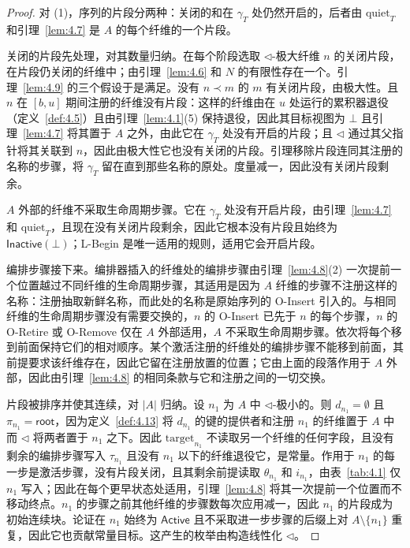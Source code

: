 \begin{proof}
对 (1)，序列的片段分两种：关闭的和在 $\gamma_T$ 处仍然开启的，后者由 $\mathrm{quiet}_T$ 和引理~\ref{lem:4.7} 是 $A$ 的每个纤维的一个片段。

关闭的片段先处理，对其数量归纳。在每个阶段选取 $\triangleleft$-极大纤维 $n$ 的关闭片段，在片段仍关闭的纤维中；由引理~\ref{lem:4.6} 和 $N$ 的有限性存在一个。引理~\ref{lem:4.9} 的三个假设于是满足。没有 $n \prec m$ 的 $m$ 有关闭片段，由极大性。且 $n$ 在 $[b, u]$ 期间注册的纤维没有片段：这样的纤维由在 $u$ 处运行的累积器退役（定义~\ref{def:4.5}）且由引理~\ref{lem:4.1}(5) 保持退役，因此其目标视图为 $\bot$ 且引理~\ref{lem:4.7} 将其置于 $A$ 之外，由此它在 $\gamma_T$ 处没有开启的片段；且 $\triangleleft$ 通过其父指针将其关联到 $n$，因此由极大性它也没有关闭的片段。引理移除片段连同其注册的名称的步骤，将 $\gamma_T$ 留在直到那些名称的原处。度量减一，因此没有关闭片段剩余。

$A$ 外部的纤维不采取生命周期步骤。它在 $\gamma_T$ 处没有开启片段，由引理~\ref{lem:4.7} 和 $\mathrm{quiet}_T$，且现在没有关闭片段剩余，因此它根本没有片段且始终为 $\mathsf{Inactive}(\bot)$；L-Begin 是唯一适用的规则，适用它会开启片段。

编排步骤接下来。编排器插入的纤维处的编排步骤由引理~\ref{lem:4.8}(2) 一次提前一个位置越过不同纤维的生命周期步骤，其适用是因为 $A$ 纤维的步骤不注册这样的名称：注册抽取新鲜名称，而此处的名称是原始序列的 O-Insert 引入的。与相同纤维的生命周期步骤没有需要交换的，$n$ 的 O-Insert 已先于 $n$ 的每个步骤，$n$ 的 O-Retire 或 O-Remove 仅在 $A$ 外部适用，$A$ 不采取生命周期步骤。依次将每个移到前面保持它们的相对顺序。某个激活注册的纤维处的编排步骤不能移到前面，其前提要求该纤维存在，因此它留在注册放置的位置；它由上面的段落作用于 $A$ 外部，因此由引理~\ref{lem:4.8} 的相同条款与它和注册之间的一切交换。

片段被排序并使其连续，对 $|A|$ 归纳。设 $n_1$ 为 $A$ 中 $\triangleleft$-极小的。则 $d_{n_1} = \emptyset$ 且 $\pi_{n_1} = \mathsf{root}$，因为定义~\ref{def:4.13} 将 $d_{n_1}$ 的键的提供者和注册 $n_1$ 的纤维置于 $A$ 中而 $\triangleleft$ 将两者置于 $n_1$ 之下。因此 $\mathrm{target}_{n_1}$ 不读取另一个纤维的任何字段，且没有剩余的编排步骤写入 $\tau_{n_1}$ 且没有 $n_1$ 以下的纤维退役它，是常量。作用于 $n_1$ 的每一步是激活步骤，没有片段关闭，且其剩余前提读取 $\theta_{n_1}$ 和 $i_{n_1}$，由表~\ref{tab:4.1} 仅 $n_1$ 写入；因此在每个更早状态处适用，引理~\ref{lem:4.8} 将其一次提前一个位置而不移动终点。$n_1$ 的步骤之前其他纤维的步骤数每次应用减一，因此 $n_1$ 的片段成为初始连续块。论证在 $n_1$ 始终为 $\mathsf{Active}$ 且不采取进一步步骤的后缀上对 $A \setminus \{n_1\}$ 重复，因此它也贡献常量目标。这产生的枚举由构造线性化 $\triangleleft$。


\end{proof}
